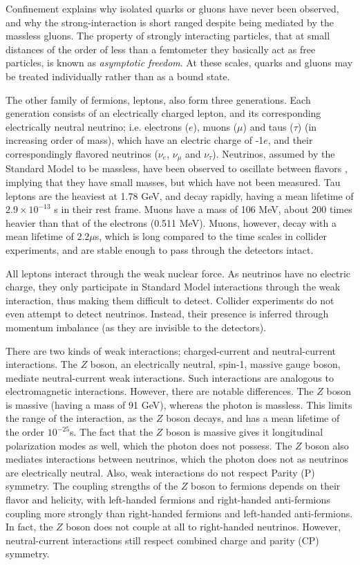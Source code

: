 \documentclass[12pt,a4paper,openright,twoside]{report}
\begin{document}
Confinement explains why isolated quarks or gluons have never been observed, and why the strong-interaction is short ranged despite being mediated by the massless gluons. The property of strongly interacting particles, that at small distances of the order of less than a femtometer they basically act as free particles, is known as \textit{asymptotic freedom}. At these scales, quarks and gluons may be treated individually rather than as a bound state. 

The other family of fermions, leptons, also form three generations. Each generation consists of an electrically charged lepton, and its corresponding electrically neutral neutrino; i.e. electrons ($e$), muons ($\mu$) and taus ($\tau$) (in increasing order of mass), which have an electric charge of -1$e$, and their correspondingly flavored neutrinos ($\nu_e$, $\nu_{\mu}$ and $\nu_{\tau}$). Neutrinos, assumed by the Standard Model to be massless, have been observed to oscillate between flavors \cite{nu1,nu2,nu3}, implying that they have small masses, but which have not been measured. Tau leptons are the heaviest at 1.78 GeV, and decay rapidly, having a mean lifetime of $2.9\times 10^{-13}$ s in their rest frame. Muons have a mass of 106 MeV, about 200 times heavier than that of the electrons (0.511 MeV). Muons, however, decay with a mean lifetime of $2.2 \mu$s, which is long compared to the time scales in collider experiments, and are stable enough to pass through the detectors intact.

All leptons interact through the weak nuclear force. As neutrinos have no electric charge, they only participate in Standard Model interactions through the weak interaction, thus making them difficult to detect. Collider experiments do not even attempt to detect neutrinos. Instead, their presence is inferred through momentum imbalance (as they are invisible to the detectors). 

There are two kinds of weak interactions; charged-current and neutral-current interactions. The $Z$ boson, an electrically neutral, spin-1, massive gauge boson, mediate neutral-current weak interactions. Such interactions are analogous to electromagnetic interactions. However, there are notable differences. The $Z$ boson is massive (having a mass of 91 GeV), whereas the photon is massless. This limits the range of the interaction, as the $Z$ boson decays, and has a mean lifetime of the order $10^{-25}$s. The fact that the $Z$ boson is massive gives it longitudinal polarization modes\cite{quarks_and_leptons} as well, which the photon does not possess. The $Z$ boson also mediates interactions between neutrinos, which the photon does not as neutrinos are electrically neutral. Also, weak interactions do not respect Parity (P) symmetry. The coupling strengths of the $Z$ boson to fermions depends on their flavor and helicity, with left-handed fermions and right-handed anti-fermions coupling more strongly than right-handed fermions and left-handed anti-fermions. In fact, the $Z$ boson does not couple at all to right-handed neutrinos. However, neutral-current interactions still respect combined charge and parity (CP) symmetry.
\end{document}
